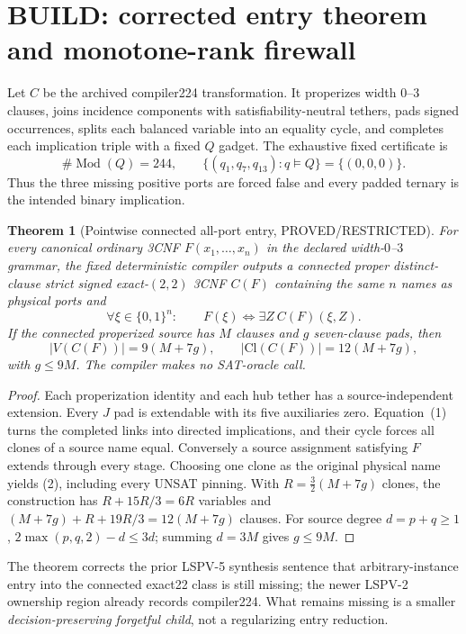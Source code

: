 \documentclass[11pt]{article}
\newtheorem{theorem}{Theorem}
\begin{document}
\section{BUILD: corrected entry theorem and monotone-rank firewall}
Let $C$ be the archived compiler224 transformation.  It properizes width $0$--$3$ clauses, joins incidence components with satisfiability-neutral tethers, pads signed occurrences, splits each balanced variable into an equality cycle, and completes each implication triple with a fixed $Q$ gadget.  The exhaustive fixed certificate is
\[
 \#\operatorname{Mod}(Q)=244,
 \qquad \{(q_1,q_7,q_{13}):q\models Q\}=\{(0,0,0)\}.
\tag{1}
\]
Thus the three missing positive ports are forced false and every padded ternary is the intended binary implication.

\begin{theorem}[Pointwise connected all-port entry, PROVED/RESTRICTED]
For every canonical ordinary 3CNF $F(x_1,\ldots,x_n)$ in the declared width-$0$--$3$ grammar, the fixed deterministic compiler outputs a connected proper distinct-clause strict signed exact-$(2,2)$ 3CNF $C(F)$ containing the same $n$ names as physical ports and
\[
 \forall \xi\in\{0,1\}^n:\qquad
 F(\xi)\iff \exists Z\ C(F)(\xi,Z).
\tag{2}
\]
If the connected properized source has $M$ clauses and $g$ seven-clause pads, then
\[
 |V(C(F))|=9(M+7g),\qquad |\mathrm{Cl}(C(F))|=12(M+7g),
\tag{3}
\]
with $g\le9M$.  The compiler makes no SAT-oracle call.
\end{theorem}
\begin{proof}
Each properization identity and each hub tether has a source-independent extension.  Every $J$ pad is extendable with its five auxiliaries zero.  Equation~(1) turns the completed links into directed implications, and their cycle forces all clones of a source name equal.  Conversely a source assignment satisfying $F$ extends through every stage.  Choosing one clone as the original physical name yields (2), including every UNSAT pinning.  With $R=\frac32(M+7g)$ clones, the construction has $R+15R/3=6R$ variables and $(M+7g)+R+19R/3=12(M+7g)$ clauses.  For source degree $d=p+q\ge1$, $2\max(p,q,2)-d\le3d$; summing $d=3M$ gives $g\le9M$.
\end{proof}

The theorem corrects the prior LSPV-5 synthesis sentence that arbitrary-instance entry into the connected exact22 class is still missing; the newer LSPV-2 ownership region already records compiler224.  What remains missing is a smaller \emph{decision-preserving forgetful child}, not a regularizing entry reduction.
\end{document}

